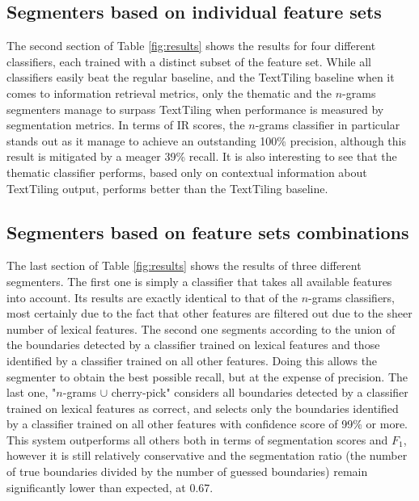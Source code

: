 \subsection{Segmenters based on individual feature sets}

The second section of Table \ref{fig:results} shows the results for four different classifiers, each trained with a distinct subset of the feature set. While all classifiers easily beat the regular baseline, and the TextTiling baseline when it comes to information retrieval metrics, only the thematic and the $n$-grams segmenters manage to surpass TextTiling when performance is measured by segmentation metrics. In terms of IR scores, the $n$-grams classifier in particular stands out as it manage to achieve an outstanding 100\% precision, although this result is mitigated by a meager 39\% recall. It is also interesting to see that the thematic classifier performs, based only on contextual information about TextTiling output, performs better than the TextTiling baseline.

\subsection{Segmenters based on feature sets combinations}

The last section of Table \ref{fig:results} shows the results of three different segmenters. The first one is simply a classifier that takes all available features into account. Its results are exactly identical to that of the $n$-grams classifiers, most certainly due to the fact that other features are filtered out due to the sheer number of lexical features. The second one segments according to the union of the boundaries detected by a classifier trained on lexical features and those identified by a classifier trained on all other features. Doing this allows the segmenter to obtain the best possible recall, but at the expense of precision. The last one, "$n$-grams $\cup$ cherry-pick"  considers all boundaries detected by a classifier trained on lexical features as correct, and selects only the boundaries identified by a classifier trained on all other features with confidence score of 99\% or more. This system outperforms all others both in terms of segmentation scores and $F_1$, however it is still relatively conservative and the segmentation ratio (the number of true boundaries divided by the number of guessed boundaries) remain significantly lower than expected, at 0.67.